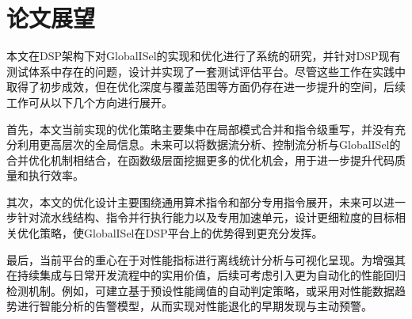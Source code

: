 \section{论文展望}
本文在DSP架构下对GlobalISel的实现和优化进行了系统的研究，并针对DSP现有测试体系中存在的问题，设计并实现了一套测试评估平台。尽管这些工作在实践中取得了初步成效，但在优化深度与覆盖范围等方面仍存在进一步提升的空间，后续工作可从以下几个方向进行展开。

\par

首先，本文当前实现的优化策略主要集中在局部模式合并和指令级重写，并没有充分利用更高层次的全局信息。未来可以将数据流分析、控制流分析与GlobalISel的合并优化机制相结合，在函数级层面挖掘更多的优化机会，用于进一步提升代码质量和执行效率。

\par

其次，本文的优化设计主要围绕通用算术指令和部分专用指令展开，未来可以进一步针对流水线结构、指令并行执行能力以及专用加速单元，设计更细粒度的目标相关优化策略，使GlobalISel在DSP平台上的优势得到更充分发挥。

\par

最后，当前平台的重心在于对性能指标进行离线统计分析与可视化呈现。为增强其在持续集成与日常开发流程中的实用价值，后续可考虑引入更为自动化的性能回归检测机制。例如，可建立基于预设性能阈值的自动判定策略，或采用对性能数据趋势进行智能分析的告警模型，从而实现对性能退化的早期发现与主动预警。

